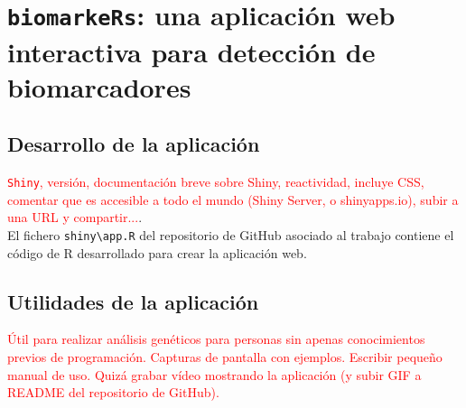 \chapter{\texttt{biomarkeRs}: una aplicación web interactiva para detección de biomarcadores}

\section{Desarrollo de la aplicación}

\textcolor{red}{\texttt{Shiny}, versión, documentación breve sobre Shiny, reactividad, incluye CSS, comentar que es accesible a todo el mundo (Shiny Server, o shinyapps.io), subir a una URL y compartir...}.\\

El fichero \texttt{shiny\textbackslash app.R} del repositorio de GitHub asociado al trabajo \cite{Redondo-Sanchez2020}  contiene el código de R desarrollado para crear la aplicación web.

\section{Utilidades de la aplicación}

\textcolor{red}{Útil para realizar análisis genéticos para personas sin apenas conocimientos previos de programación. Capturas de pantalla con ejemplos. Escribir pequeño manual de uso. Quizá grabar vídeo mostrando la aplicación (y subir GIF a README del repositorio de GitHub).}
